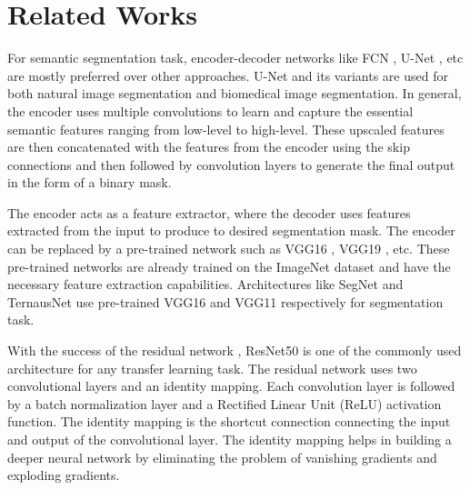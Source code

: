 \documentclass[sigconf]{acmart-me}
\begin{document}
\section{Related Works}
\label{sec:work}
For semantic segmentation task, encoder-decoder networks like FCN \cite{long2015fully}, U-Net \cite{ronneberger2015u}, etc are mostly preferred over other approaches. U-Net and its variants are used for both natural image segmentation and biomedical image segmentation. In general, the encoder uses multiple convolutions to learn and capture the essential semantic features ranging from low-level to high-level. These upscaled features are then concatenated with the features from the encoder using the skip connections and then followed by convolution layers to generate the final output in the form of a binary mask.

The encoder acts as a feature extractor,  where the decoder uses features extracted from the input to produce to desired segmentation mask. The encoder can be replaced by a pre-trained network such as VGG16 \cite{simonyan2014very}, VGG19 \cite{simonyan2014very},  etc. These pre-trained networks are already trained on the ImageNet \cite{russakovsky2015imagenet} dataset and have the necessary feature extraction capabilities. Architectures like SegNet \cite{badrinarayanan2017segnet} and TernausNet \cite{iglovikov2018ternausnet} use pre-trained VGG16 and VGG11 respectively for segmentation task. 

With the success of the residual network \cite{he2016deep}, ResNet50 is one of the commonly used architecture for any transfer learning task. The residual network uses two  convolutional layers and an identity mapping. Each convolution layer is followed by a batch normalization layer and a Rectified Linear Unit (ReLU) activation function. The identity mapping is the shortcut connection connecting the input and output of the convolutional layer. The identity mapping helps in building a deeper neural network by eliminating the problem of vanishing gradients and exploding gradients.
\end{document}
